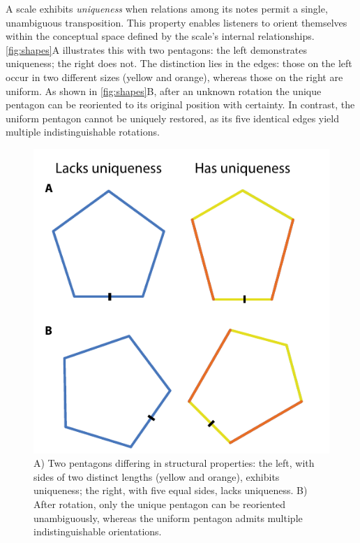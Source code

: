 \documentclass[10pt,twocolumn]{article}
\numberwithin{equation}{section} %
\begin{document}
    A scale exhibits \textit{uniqueness} when relations among its notes permit a single, unambiguous transposition.
    This property enables listeners to orient themselves within the conceptual space defined by the scale’s internal relationships.
    \autoref{fig:shapes}A illustrates this with two pentagons: the left demonstrates uniqueness; the right does not.
    The distinction lies in the edges: those on the left occur in two different sizes (yellow and orange), whereas those on the right are uniform.
    As shown in \autoref{fig:shapes}B, after an unknown rotation the unique pentagon can be reoriented to its original position with certainty.
    In contrast, the uniform pentagon cannot be uniquely restored, as its five identical edges yield multiple indistinguishable rotations.

    \begin{figure}[htbp]
        \centering
        \includegraphics[width=\linewidth]{figures/two-shapes}%
        \caption{A) Two pentagons differing in structural properties: the left, with sides of two distinct lengths (yellow and orange), exhibits uniqueness; the right, with five equal sides, lacks uniqueness.
        B) After rotation, only the unique pentagon can be reoriented unambiguously, whereas the uniform pentagon admits multiple indistinguishable orientations.}
        \label{fig:shapes}
    \end{figure}
\end{document}
